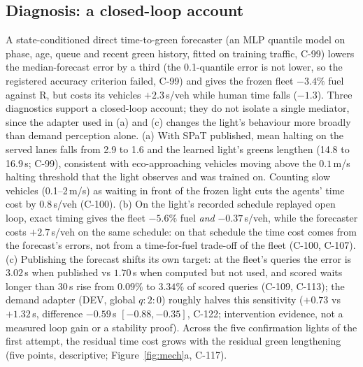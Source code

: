 \documentclass[11pt]{article}
\begin{document}
\subsection{Diagnosis: a closed-loop account}
A state-conditioned direct time-to-green forecaster (an MLP quantile model on phase, age, queue and recent green history, fitted on training
traffic, C-99) lowers the median-forecast error by a third (the 0.1-quantile error is not lower, so the
registered accuracy criterion failed, C-99) and gives the frozen fleet $-3.4\%$ fuel against R, but costs its vehicles
$+2.3$\,s/veh while human time falls ($-1.3$). Three diagnostics support a closed-loop account; they do not isolate a single mediator,
since the adapter used in (a) and (c) changes the light's behaviour more broadly than demand perception alone.
(a) With SPaT published, mean halting on the served lanes falls from 2.9 to 1.6 and the learned light's greens lengthen (14.8 to 16.9\,s; C-99),
consistent with eco-approaching vehicles moving above the $0.1$\,m/s halting threshold that the light observes and was trained on. Counting slow vehicles
(0.1--2\,m/s) as waiting in front of the frozen light cuts the agents' time cost by $0.8$\,s/veh (C-100).
(b) On the light's recorded schedule replayed open loop, exact timing gives the fleet $-5.6\%$ fuel \emph{and} $-0.37$\,s/veh, while the forecaster
costs $+2.7$\,s/veh on the same schedule: on that schedule the time cost comes from the forecast's errors, not from a time-for-fuel
trade-off of the fleet (C-100, C-107).
(c) Publishing the forecast shifts its own target: at the fleet's queries the error is $3.02$\,s when published vs $1.70$\,s when computed
but not used, and scored waits longer than 30\,s rise from $0.09\%$ to $3.34\%$ of scored queries (C-109, C-113); the demand adapter (DEV, global $q{:}2{:}0$) roughly halves this
sensitivity ($+0.73$ vs $+1.32$\,s, difference $-0.59$\,s $[-0.88,-0.35]$, C-122; intervention evidence, not a measured loop gain or a stability proof). Across the five confirmation lights of the first attempt, the residual time cost grows with the residual green
lengthening (five points, descriptive; Figure~\ref{fig:mech}a, C-117).
\end{document}
